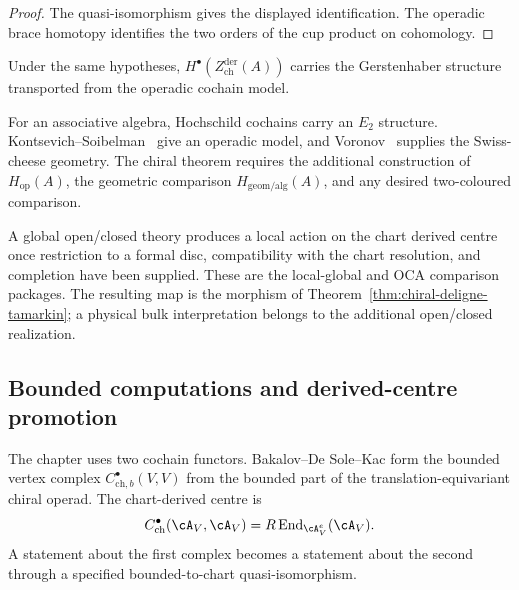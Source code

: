 \begin{proof}
The quasi-isomorphism gives the displayed identification.  The
operadic brace homotopy identifies the two orders of the cup product
on cohomology.
\end{proof}

\begin{corollary}
\label{cor:gerstenhaber-cohomology}
Under the same hypotheses,
\(H^\bullet(Z^{\mathrm{der}}_{\mathrm{ch}}(A))\) carries the
Gerstenhaber structure transported from the operadic cochain model.
\end{corollary}

\begin{remark}
\label{rem:classical-deligne}
For an associative algebra, Hochschild cochains carry an \(E_2\)
structure.  Kontsevich--Soibelman~\cite{KS00} give an operadic model,
and Voronov~\cite{Voronov99} supplies the Swiss-cheese geometry.  The
chiral theorem requires the additional construction of
\(H_{\mathrm{op}}(A)\), the geometric comparison
\(H_{\mathrm{geom/alg}}(A)\), and any desired two-coloured comparison.
\end{remark}

\begin{remark}
\label{rem:chiral-center-global-bridge}
A global open/closed theory produces a local action on the chart
derived centre once restriction to a formal disc, compatibility with
the chart resolution, and completion have been supplied.  These are
the local-global and OCA comparison packages.  The resulting map is
the morphism of
Theorem~\ref{thm:chiral-deligne-tamarkin}; a physical bulk
interpretation belongs to the additional open/closed realization.
\end{remark}



\subsection{Bounded computations and derived-centre promotion}
\label{subsec:derived-center-explicit}

The chapter uses two cochain functors.  Bakalov--De Sole--Kac form the
bounded vertex complex
\(C^\bullet_{\mathrm{ch},b}(V,V)\) from the bounded part of the
translation-equivariant chiral operad.  The chart-derived centre is
\[
 C^\bullet_{\mathrm{ch}}(\cA_V,\cA_V)
 =
 R\operatorname{End}_{\cA_V^e}(\cA_V).
\]
A statement about the first complex becomes a statement about the
second through a specified bounded-to-chart quasi-isomorphism.

